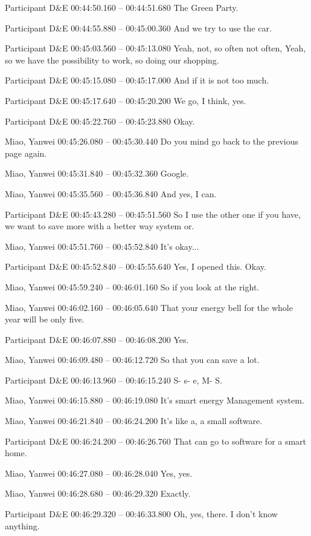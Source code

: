 {Participant D\&E 00:44:50.160 -- 00:44:51.680
The Green Party.

Participant D\&E 00:44:55.880 -- 00:45:00.360
And we try to use the car.

Participant D\&E 00:45:03.560 -- 00:45:13.080
Yeah, not, so often not often, Yeah, so we have the possibility to work, so doing our shopping.

Participant D\&E 00:45:15.080 -- 00:45:17.000
And if it is not too much.

Participant D\&E 00:45:17.640 -- 00:45:20.200
We go, I think, yes.

Participant D\&E 00:45:22.760 -- 00:45:23.880
Okay.

Miao, Yanwei 00:45:26.080 -- 00:45:30.440
Do you mind go back to the previous page again.

Miao, Yanwei 00:45:31.840 -- 00:45:32.360
Google.

Miao, Yanwei 00:45:35.560 -- 00:45:36.840
And yes, I can.

Participant D\&E 00:45:43.280 -- 00:45:51.560
So I use the other one if you have, we want to save more with a better way system or.

Miao, Yanwei 00:45:51.760 -- 00:45:52.840
It's okay...

Participant D\&E 00:45:52.840 -- 00:45:55.640
Yes, I opened this. Okay.

Miao, Yanwei 00:45:59.240 -- 00:46:01.160
So if you look at the right.

Miao, Yanwei 00:46:02.160 -- 00:46:05.640
That your energy bell for the whole year will be only five.

Participant D\&E 00:46:07.880 -- 00:46:08.200
Yes.

Miao, Yanwei 00:46:09.480 -- 00:46:12.720
So that you can save a lot.

Participant D\&E 00:46:13.960 -- 00:46:15.240
S- s- e, M- S.

Miao, Yanwei 00:46:15.880 -- 00:46:19.080
It's smart energy Management system.

Miao, Yanwei 00:46:21.840 -- 00:46:24.200
It's like a, a small software.

Participant D\&E 00:46:24.200 -- 00:46:26.760
That can go to software for a smart home.

Miao, Yanwei 00:46:27.080 -- 00:46:28.040
Yes, yes.

Miao, Yanwei 00:46:28.680 -- 00:46:29.320
Exactly.

Participant D\&E 00:46:29.320 -- 00:46:33.800
Oh, yes, there. I don't know anything.

}

